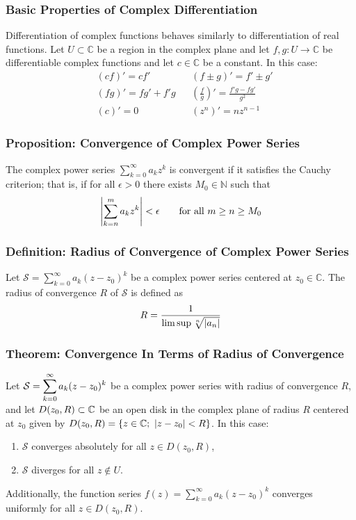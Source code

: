 \documentclass[11pt, a4paper]{article}
\newcommand{\C}{\mathbb{C}} %
\begin{document}
\subsubsection{Basic Properties of Complex Differentiation}
Differentiation of complex functions behaves similarly to differentiation of real functions. Let $ U \subset \C $ be a region in the complex plane and let $ f, g : U \to \C $ be differentiable complex functions and let $ c \in \C $ be a constant. In this case:
\begin{align*}
	&(cf)' = cf' && (f \pm g)' = f' \pm g'\\
	&(fg)' = fg' + f'g && \left(\frac{f}{g}\right)'= \frac{f'g - fg'}{g^2}\\
	&(c)' = 0 & &\left(z^n\right)'= n z^{n-1}
\end{align*}

\subsubsection{Proposition: Convergence of Complex Power Series}
The complex power series $\displaystyle{ \sum_{k = 0}^{\infty} a_{k}z^{k}} $ is convergent if it satisfies the Cauchy criterion; that is, if for all $ \epsilon > 0 $ there exists $ M_0 \in \mathbb{N}$ such that
\begin{equation*}
	\abs{\sum_{k = n}^{m} a_k z^{k}} < \epsilon \qquad \text{for all } m \geq n \geq M_0
\end{equation*}

\subsubsection{Definition: Radius of Convergence of Complex Power Series}
Let $\displaystyle{\mathcal{S} = \sum_{k = 0}^{\infty} a_{k}(z - z_0)^{k}} $ be a complex power series centered at $ z_0 \in \C $. The radius of convergence $ R $ of $ \mathcal{S} $ is defined as
\begin{align*}
	R = \frac{1}{\limsup \sqrt[n]{\abs{a_n}}}
\end{align*}

\subsubsection{Theorem: Convergence In Terms of Radius of Convergence}
Let $\displaystyle{\mathcal{S} = \sum_{k = 0}^{\infty} a_{k}(z - z_0)^{k}} \vspace{0.5mm} $ be a complex power series with radius of convergence $ R $, and let $ D(z_0, R) \subset \C \vspace{1mm}$ be an open disk in the complex plane of radius $ R $ centered at $ z_0 $ given by $ \displaystyle{D(z_0, R) = \left\{ z \in \C; \ \abs{z - z_0} < R \right\}} $. In this case:
\begin{enumerate}
	\item $ \mathcal{S} $ converges absolutely for all $ z \in D(z_0, R) $, 
	\item $ \mathcal{S} $ diverges for all $ z \notin U $.
\end{enumerate}
Additionally, the function series $ \displaystyle{f(z) = \sum_{k = 0}^{\infty} a_{k}(z - z_0)^{k}} $ converges uniformly for all $ z \in  D(z_0, R)$.
\end{document}
